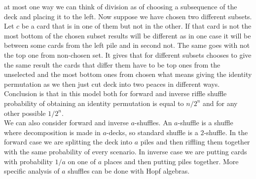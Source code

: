 \documentclass[a4paper, 12pt]{article}
\begin{document}
at most one way we can think of division as of choosing a subsequence of the deck and placing it to the left.
Now suppose we have chosen two different subsets. Let $c$ be a card that is in one of them but not in the
other. If that card is not the most bottom of the chosen subset results will be different as in one case
it will be between some cards from the left pile and in second not. The same goes with not the top one
from non-chosen set. It gives that for different subsets chooses to give the same result the cards that
differ them have to be top ones from the unselected and the most bottom ones from chosen what means
giving the identity permutation as we then just cut deck into two peaces in different ways. \\
Conclusion is that in this model both for forward and inverse riffle shuffle probability of obtaining
an identity permutation is equal to $n/2^n$ and for any other possible $1/2^n$. \\
We can also consider forward and inverse $a$-shuffles. An $a$-shuffle is a shuffle where decomposition
is made in $a$-decks, so standard shuffle is a $2$-shuffle. In the forward case we are splitting the deck
into $a$ piles and then riffling them together with the same probability of every scenario.
In inverse case we are putting cards with probability $1/a$ on one of $a$ places and then putting piles
together. More specific analysis of $a$ shuffles can be done with Hopf algebras.
\end{document}

